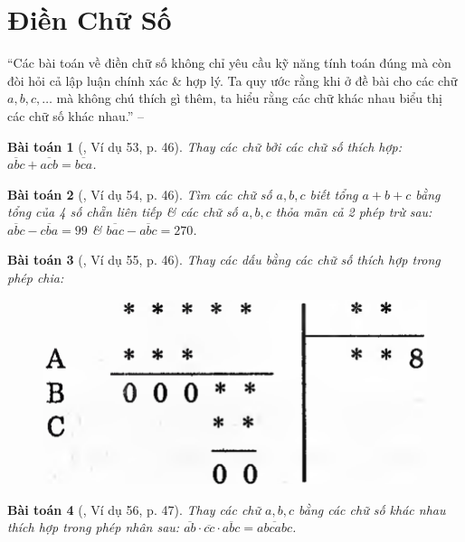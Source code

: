 \documentclass{article}
\numberwithin{equation}{section}
\newtheorem{baitoan}{Bài toán}
\begin{document}

\section{Điền Chữ Số}
``Các bài toán về điền chữ số không chỉ yêu cầu kỹ năng tính toán đúng mà còn đòi hỏi cả lập luận chính xác \& hợp lý. Ta quy ước rằng khi ở đề bài cho các chữ $a,b,c,\ldots$ mà không chú thích gì thêm, ta hiểu rằng các chữ khác nhau biểu thị các chữ số khác nhau.'' -- \cite[p. 46]{Binh_Toan_6_tap_1}

\begin{baitoan}[\cite{Binh_Toan_6_tap_1}, Ví dụ 53, p. 46]
	Thay các chữ bởi các chữ số thích hợp: $\overline{abc} + \overline{acb} = \overline{bca}$.
\end{baitoan}

\begin{baitoan}[\cite{Binh_Toan_6_tap_1}, Ví dụ 54, p. 46]
	Tìm các chữ số $a,b,c$ biết tổng $a + b + c$ bằng tổng của 4 số chẵn liên tiếp \& các chữ số $a,b,c$ thỏa mãn cả 2 phép trừ sau: $\overline{abc} - \overline{cba} = 99$ \& $\overline{bac} - \overline{abc} = 270$.
\end{baitoan}

\begin{baitoan}[\cite{Binh_Toan_6_tap_1}, Ví dụ 55, p. 46]
	Thay các dấu {\bf*} bằng các chữ số thích hợp trong phép chia:
	\begin{figure}[H]
		\centering
		\includegraphics[scale=0.13]{Binh_vi_du_55_p_47}
	\end{figure}
\end{baitoan}

\begin{baitoan}[\cite{Binh_Toan_6_tap_1}, Ví dụ 56, p. 47]
	Thay các chữ $a,b,c$ bằng các chữ số khác nhau thích hợp trong phép nhân sau: $\overline{ab}\cdot\overline{cc}\cdot\overline{abc} = \overline{abcabc}$.
\end{baitoan}
\end{document}

